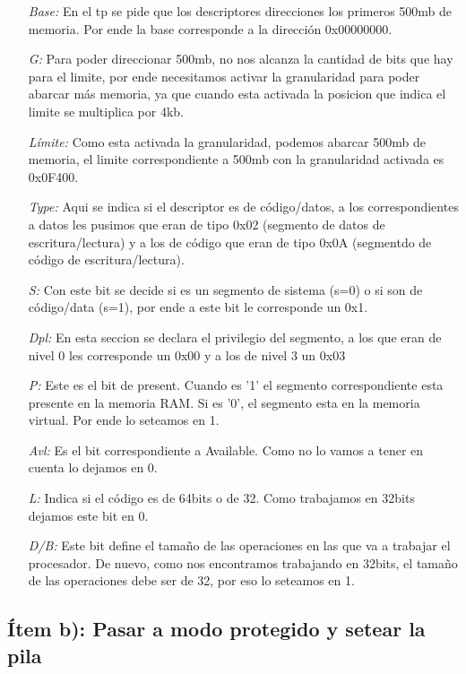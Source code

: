 \begin{itemize}
\item [\textit{Base:}] En el tp se pide que los descriptores direcciones los primeros 500mb de memoria. Por ende la base corresponde a la dirección 0x00000000.
\item [\textit{G:}]  Para poder direccionar 500mb, no nos alcanza la cantidad de bits que hay para el limite, por ende necesitamos activar la granularidad para poder abarcar más memoria, ya que cuando esta activada la posicion que indica el limite se multiplica por 4kb.
\item [\textit{Límite:}] Como esta activada la granularidad, podemos abarcar 500mb de memoria, el limite correspondiente a 500mb con la granularidad activada es 0x0F400.
\item [\textit{Type:}] Aqui se indica si el descriptor es de código/datos, a los correspondientes a datos les pusimos que eran de tipo 0x02 (segmento de datos de escritura/lectura) y a los de código que eran de tipo 0x0A (segmentdo de código de escritura/lectura).
\item [\textit{S:}] Con este bit se decide si es un segmento de sistema (s=0) o si son de código/data (s=1), por ende a este bit le corresponde un 0x1.
\item [\textit{Dpl:}] En esta seccion se declara el privilegio del segmento, a los que eran de nivel 0 les corresponde un 0x00 y a los de nivel 3 un 0x03
\item [\textit{P:}] Este es el bit de present. Cuando es ’1’ el segmento correspondiente esta presente en la memoria RAM. Si es ’0’, el segmento esta en la memoria virtual. Por ende lo seteamos en 1.
\item [\textit{Avl:}] Es el bit correspondiente a Available. Como no lo vamos a tener en cuenta lo dejamos en 0.
\item [\textit{L:}] Indica si el código es de 64bits o de 32. Como trabajamos en 32bits dejamos este bit en 0.
\item [\textit{D/B:}] Este bit define el tamaño de las operaciones en las que va a trabajar el procesador. De nuevo, como nos encontramos trabajando en 32bits, el tamaño de las operaciones debe ser de 32, por eso lo seteamos en 1.
\end{itemize}

\subsection{Ítem b): Pasar a modo protegido y setear la pila}

